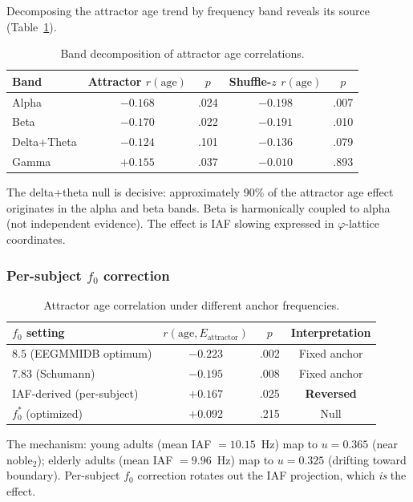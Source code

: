 \documentclass[11pt,a4paper]{article}
\newcommand{\phisym}{\varphi}
\newcommand{\fzero}{f_0}
\begin{document}
Decomposing the attractor age trend by frequency band reveals its source (Table~\ref{tab:band_decomp}).

\begin{table}[H]
\centering
\caption{Band decomposition of attractor age correlations.}
\label{tab:band_decomp}
\begin{tabular}{lcccc}
\toprule
Band & Attractor $r(\text{age})$ & $p$ & Shuffle-$z$ $r(\text{age})$ & $p$ \\
\midrule
Alpha & $-0.168$ & .024 & $-0.198$ & .007 \\
Beta & $-0.170$ & .022 & $-0.191$ & .010 \\
Delta+Theta & $-0.124$ & .101 & $-0.136$ & .079 \\
Gamma & $+0.155$ & .037 & $-0.010$ & .893 \\
\bottomrule
\end{tabular}
\end{table}

The delta+theta null is decisive: approximately 90\% of the attractor age effect originates in the alpha and beta bands. Beta is harmonically coupled to alpha (not independent evidence). The effect is IAF slowing \parencite{Scally2018, Klimesch1999} expressed in $\phisym$-lattice coordinates.

\subsubsection{Per-subject $\fzero$ correction}

\begin{table}[H]
\centering
\caption{Attractor age correlation under different anchor frequencies.}
\label{tab:f0_correction}
\begin{tabular}{lccc}
\toprule
$\fzero$ setting & $r(\text{age}, E_{\text{attractor}})$ & $p$ & Interpretation \\
\midrule
$8.5$ (EEGMMIDB optimum) & $-0.223$ & .002 & Fixed anchor \\
$7.83$ (Schumann) & $-0.195$ & .008 & Fixed anchor \\
IAF-derived (per-subject) & $\mathbf{+0.167}$ & .025 & \textbf{Reversed} \\
$\fzero^*$ (optimized) & $+0.092$ & .215 & Null \\
\bottomrule
\end{tabular}
\end{table}

The mechanism: young adults (mean IAF $= 10.15$~Hz) map to $u = 0.365$ (near noble$_2$); elderly adults (mean IAF $= 9.96$~Hz) map to $u = 0.325$ (drifting toward boundary). Per-subject $\fzero$ correction rotates out the IAF projection, which \textit{is} the effect.
\end{document}
